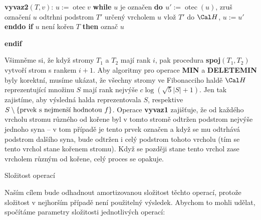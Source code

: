 \documentclass[a4paper,12pt]{article}
\DeclareMathOperator*{\otec}{otec}
\begin{document}
{\bf vyvaz2$(T,v)$}:\newline 
$u:=\otec v$\newline 
{\bf while} $u$ je označen {\bf do\newline 
\phantom{{\rm ---}}$u':=\otec(u)$}, zruš označení $u$\newline 
\phantom{---}odtrhni podstrom $T'$ určený vrcholem $u$\newline 
\phantom{---}vlož $T'$ do $\Cal H$, $u:=u'$\newline 
{\bf enddo\newline 
if} $u$ není kořen $T$ {\bf then} označ $u$ {\bf endif

}
Všimněme si, že když stromy $T_1$ a $T_2$ mají rank 
$i$, pak procedura {\bf spoj$(T_1,T_2)$} vytvoří strom s rankem 
$i+1$.  Aby algoritmy pro operace {\bf MIN} a {\bf DELETEMIN} byly 
korektní, musíme ukázat, že všechny stromy ve 
Fibonacciho haldě $\Cal H$ reprezentující množinu $
S$ mají rank 
nejvýše $c\log(\sqrt 5|S|+1)$. Jen tak zajistíme, aby výsledná 
halda reprezentovala $S$, res\-pektive 
$S\setminus \{\text{\rm prvek s nejmenší hodnotou }f\}$.  Operace {\bf vyvaz1 }
zajišťuje, že od každého vrcholu stromu různého 
od kořene byl v tomto stromě odtržen podstrom nejvýše 
jednoho syna -- v tom případě je tento prvek označen a 
když se mu odtrhává podstrom dalšího syna, bude odtržen 
i celý podstrom tohoto vrcholu (tím se tento vrchol stane kořenem 
stromu).  Když se později stane tento vrchol zase 
vrcholem různým od kořene, celý proces se 
opakuje. 

\head
Složitost operací
\endhead

Naším cílem bude odhadnout amortizovanou složitost těchto 
operací, protože složitost v nejhorším případě není 
použitelný výsledek.  Abychom to mohli udělat, spočítáme parametry 
složitosti jednotlivých operací:  
\end{document}
